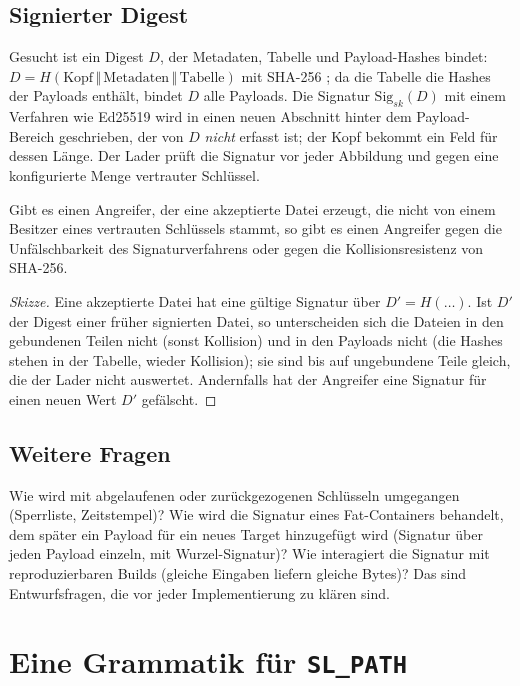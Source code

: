 \subsection{Signierter Digest}

Gesucht ist ein Digest $D$, der Metadaten, Tabelle und Payload-Hashes bindet: $D=H(\mathrm{Kopf}\,\Vert\,\mathrm{Metadaten}\,\Vert\,\mathrm{Tabelle})$ mit SHA-256 \cite{fips180}; da die Tabelle die Hashes der Payloads enthält, bindet $D$ alle Payloads. Die Signatur $\mathrm{Sig}_{sk}(D)$ mit einem Verfahren wie Ed25519 \cite{rfc8032} wird in einen neuen Abschnitt hinter dem Payload-Bereich geschrieben, der von $D$ \emph{nicht} erfasst ist; der Kopf bekommt ein Feld für dessen Länge. Der Lader prüft die Signatur vor jeder Abbildung und gegen eine konfigurierte Menge vertrauter Schlüssel.

\begin{satz}
	Gibt es einen Angreifer, der eine akzeptierte Datei erzeugt, die nicht von einem Besitzer eines vertrauten Schlüssels stammt, so gibt es einen Angreifer gegen die Unfälschbarkeit des Signaturverfahrens oder gegen die Kollisionsresistenz von SHA-256.
\end{satz}

\begin{proof}[Skizze]
	Eine akzeptierte Datei hat eine gültige Signatur über $D'=H(\ldots)$. Ist $D'$ der Digest einer früher signierten Datei, so unterscheiden sich die Dateien in den gebundenen Teilen nicht (sonst Kollision) und in den Payloads nicht (die Hashes stehen in der Tabelle, wieder Kollision); sie sind bis auf ungebundene Teile gleich, die der Lader nicht auswertet. Andernfalls hat der Angreifer eine Signatur für einen neuen Wert $D'$ gefälscht.
\end{proof}

\subsection{Weitere Fragen}

Wie wird mit abgelaufenen oder zurückgezogenen Schlüsseln umgegangen (Sperrliste, Zeitstempel)? Wie wird die Signatur eines Fat-Containers behandelt, dem später ein Payload für ein neues Target hinzugefügt wird (Signatur über jeden Payload einzeln, mit Wurzel-Signatur)? Wie interagiert die Signatur mit reproduzierbaren Builds (gleiche Eingaben liefern gleiche Bytes)? Das sind Entwurfsfragen, die vor jeder Implementierung zu klären sind.

\section{Eine Grammatik für \texttt{SL\_PATH}}
\label{sec:slpath-ausblick}


